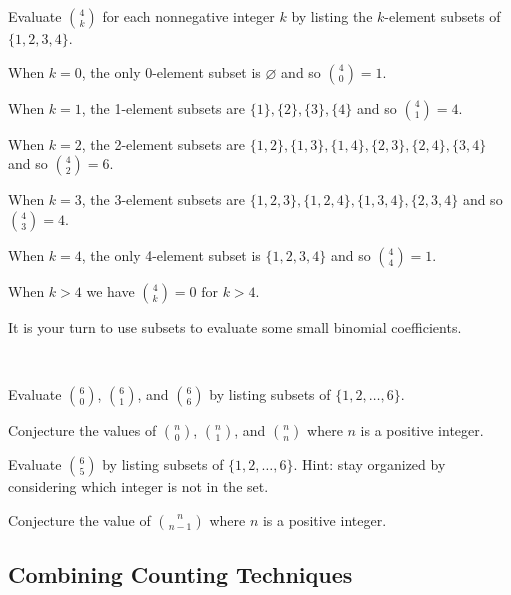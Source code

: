\begin{exam}
\label{exam_four_choose_k}
Evaluate $\binom{4}{k}$ for each nonnegative integer $k$ by listing the $k$-element subsets of $\{1,2,3,4\}$.
    \begin{soln}
        When $k=0$, the only 0-element subset is $\varnothing$ and so $\binom{4}{0}=1.$

        When $k=1$, the 1-element subsets are
        $\{1\}, \{2\}, \{3\}, \{4\}$ and so $\binom{4}{1}=4.$

        When $k=2$, the 2-element subsets are 
        $\{1,2\}, \{1,3\}, \{1,4\}, \{2,3\}, \{2,4\}, \{3,4\}$
        and so $\binom{4}{2}=6.$
        
        When $k=3$, the 3-element subsets are 
        $\{1,2,3\}, \{1,2,4\}, \{1,3, 4\}, \{2,3,4\}$
        and so $\binom{4}{3}=4.$

        When $k=4$, the only 4-element subset is
        $\{1,2,3,4\}$
        and so $\binom{4}{4}=1.$

        When $k >4$ we have 
        $\binom{4}{k}=0 \text{ for } k>4.$
    \end{soln}
\end{exam}

It is your turn to use subsets to evaluate some small binomial coefficients.

\begin{act} 
\label{act_eval_6choosek}
~    
    \begin{actpart}
        \item Evaluate $\binom{6}{0}$, $\binom{6}{1}$, and $\binom{6}{6}$ by listing subsets of $\{1,2,\ldots,6\}$.
        \item Conjecture the values of $\binom{n}{0}$, $\binom{n}{1}$, and $\binom{n}{n}$ where $n$ is a positive integer.
        \item Evaluate $\binom{6}{5}$ by listing subsets of $\{1,2,\ldots,6\}$.  Hint: stay organized by considering which integer is not in the set.
        \item Conjecture the value of $\binom{n}{n-1}$ where $n$ is a positive integer.
    \end{actpart}
\end{act}

\newcommand{\subcombinecount}{Combining Counting Techniques}
\subsection{\subcombinecount}
\label{sub_combine_count}

